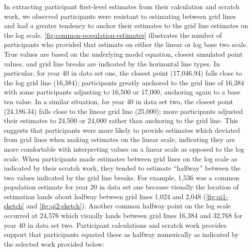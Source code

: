 \documentclass[print]{nuthesis}
\begin{document}
In extracting participant first-level estimates from their calculation and scratch work, we observed participants were resistant to estimating between grid lines and had a greater tendency to anchor their estimates to the grid line estimates on the log scale.
\cref{fig:common-population-estimates} illustrates the number of participants who provided that estimate on either the linear or log base two scale.
True values are based on the underlying model equation, closest simulated point values, and grid line breaks are indicated by the horizontal line types.
In particular, for year 40 in data set one, the closest point (17,046.94) falls close to the log grid line (16,384); participants greatly anchored to the grid line of 16,384 with some participants adjusting to 16,500 or 17,000, anchoring again to a base ten value.
In a similar situation, for year 40 in data set two, the closest point (24,186.34) falls close to the linear grid line (25,000); more participants adjusted their estimates to 24,500 or 24,000 rather than anchoring to the grid line.
This suggests that participants were more likely to provide estimates which deviated from grid lines when making estimates on the linear scale, indicating they are more comfortable with interpreting values on a linear scale as opposed to the log scale.
When participants made estimates between grid lines on the log scale as indicated by their scratch work, they tended to estimate ``halfway'' between the two values indicated by the grid line breaks.
For example, 1,536 was a common population estimate for year 20 in data set one because visually the location of estimation lands about halfway between grid lines 1,024 and 2,048 (\cref{fig:qi1-sketch} and \cref{fig:qi2-sketch}).
Another common halfway point on the log scale occurred at 24,576 which visually lands between grid lines 16,384 and 32,768 for year 40 in data set two.
Participant calculations and scratch work provides support that participants equated these as halfway numerically as indicated by the selected work provided below:
\end{document}
